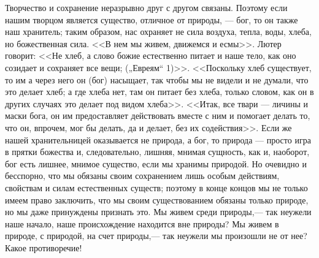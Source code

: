 \documentclass[12pt]{article}
\begin{document}
Творчество и сохранение неразрывно друг с другом связаны. Поэтому если нашим творцом является существо, отличное от природы, --- бог, то он также наш хранитель; таким образом, нас охраняет не сила воздуха, тепла, воды, хлеба, но божественная сила. <<В нем мы живем, движемся и есмы>>. Лютер говорит: <<Не хлеб, а слово божие естественно питает и наше тело, как оно созидает и сохраняет все вещи; („Евреям“ 1)>>. <<Поскольку хлеб существует, то им а через него он (бог) насыщает, так чтобы мы не видели и не думали, что это делает хлеб; а где хлеба нет, там он питает без хлеба, только словом, как он в других случаях это делает под видом хлеба>>. <<Итак, все твари --- личины и маски бога, он им предоставляет действовать вместе с ним и помогает делать то, что он, впрочем, мог бы делать, да и делает, без их содействия>>. Если же нашей хранительницей оказывается не природа, а бог, то природа --- просто игра в прятки божества и, следовательно, лишняя, мнимая сущность, как и, наоборот, бог есть лишнее, мнимое существо, если мы хранимы природой. Но очевидно и бесспорно, что мы обязаны своим сохранением лишь особым действиям, свойствам и силам естественных существ; поэтому в конце концов мы не только имеем право заключить, что мы своим существованием обязаны только природе, но мы даже принуждены признать это. Мы живем среди природы,--- так неужели наше начало, наше происхождение находится вне природы? Мы живем в природе, с природой, на счет природы,--- так неужели мы произошли не от нее? Какое противоречие!

\section{}
\end{document}

